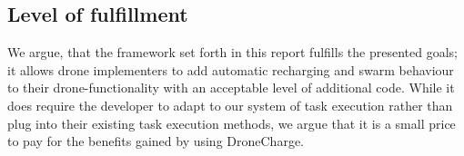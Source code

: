 \subsection{Level of fulfillment}
We argue, that the framework set forth in this report fulfills the presented goals; it allows drone implementers to add automatic recharging and swarm behaviour to their drone-functionality with an acceptable level of additional code. While it does require the developer to adapt to our system of task execution rather than plug into their existing task execution methods, we argue that it is a small price to pay for the benefits gained by using DroneCharge.
